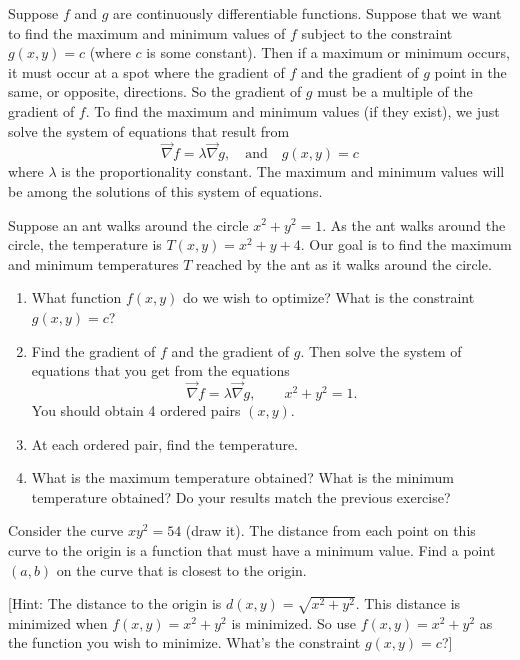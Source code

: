 \begin{theorem}
Suppose $f$ and $g$ are continuously differentiable functions. Suppose that we want to find the maximum and minimum values of $f$ subject to the constraint $g(x,y)=c$ (where $c$ is some constant).  Then if a maximum or minimum occurs, it must occur at a spot where the gradient of $f$ and the gradient of $g$ point in the same, or opposite, directions. So the gradient of $g$ must be a multiple of the gradient of $f$. To find the maximum and minimum values (if they exist), we just solve the system of equations that result from  
$$\vec \nabla f = \lambda \vec \nabla g,\quad \text{and}\quad g(x,y)=c$$ where $\lambda$ is the proportionality constant. The maximum and minimum values will be among the solutions of this system of equations. 
\end{theorem}

\begin{problem}
 Suppose an ant walks around the circle $x^2+y^2=1$.  As the ant walks around the circle, the temperature is $T(x,y) = x^2+y+4$.  Our goal is to find the maximum and minimum temperatures $T$ reached by the ant as it walks around the circle. 
 \begin{enumerate}
  \item What function $f(x,y)$ do we wish to optimize? What is the constraint $g(x,y)=c$?
  \item {}%
Find the gradient of $f$ and the gradient of $g$.  Then solve the system of equations that you get from the equations $$\vec \nabla f = \lambda \vec \nabla g, \quad \quad x^2+y^2=1.$$ 
  You should obtain 4 ordered pairs $(x,y)$.
  \item At each ordered pair, find the temperature. 
	\item What is the maximum temperature obtained? What is the minimum temperature obtained? Do your results match the previous exercise?
 \end{enumerate}
\end{problem}

\begin{problem}
%
 Consider the curve $xy^2=54$ (draw it). The distance from each point on this curve to the origin is a function that must have a minimum value. Find a point $(a,b)$ on the curve that is closest to the origin.  

[Hint: The distance to the origin is $d(x,y)=\sqrt{x^2+y^2}.$ This distance is minimized when $f(x,y) = x^2+y^2$ is minimized. So use $f(x,y)=x^2+y^2$ as the function you wish to minimize. What's the constraint $g(x,y)=c$?]
\end{problem}

